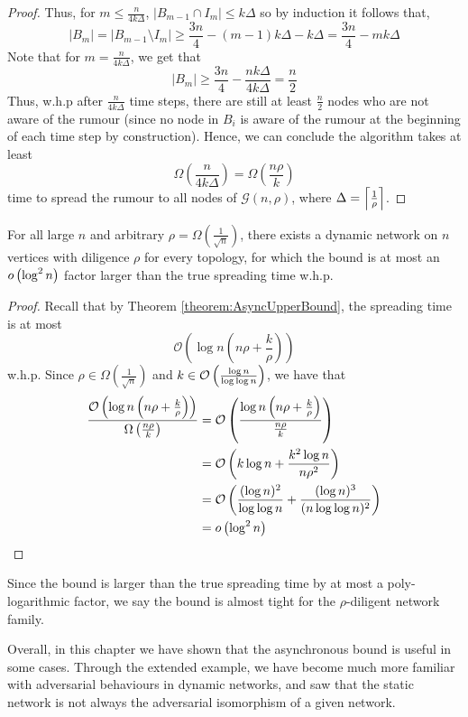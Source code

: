 \begin{proof}
	Thus, for $m \leq \frac{n}{4k\Delta}$, $|B_{m-1} \cap I_m| \leq k\Delta$ so by induction it follows that,
	$$
		|B_m| = |B_{m-1} \setminus I_m| \geq \frac{3n}{4} - (m-1)k\Delta - k\Delta = \frac{3n}{4} - mk\Delta
	$$
	Note that for $m = \frac{n}{4k\Delta}$, we get that 
	$$
		|B_m| \geq \frac{3n}{4} - \frac{nk\Delta}{4k\Delta} = \frac{n}{2}
	$$
	Thus, w.h.p after $\frac{n}{4k\Delta}$ time steps, there are still at least $\frac{n}{2}$ nodes who are not aware of the rumour (since no node in $B_i$ is aware of the rumour at the beginning of each time step by construction). Hence, we can conclude the algorithm takes at least 
	$$
		\Omega\left(\frac{n}{4k\Delta}\right) = \Omega\left(\frac{n\rho}{k}\right)
	$$
	time to spread the rumour to all nodes of $\mathcal{G}(n, \rho)$, where $\Delta = \ceil*{\frac{1}{\rho}}$.
\end{proof}

\begin{corollary}
	For all large $n$ and arbitrary $\rho = \Omega\left(\frac{1}{\sqrt{n}}\right)$, there exists a dynamic network on $n$ vertices with diligence $\rho$ for every topology, for which the bound is at most an $o\lb \log^2 n \rb$ factor larger than the true spreading time w.h.p.
\end{corollary}

\begin{proof}
	Recall that by Theorem \ref{theorem:AsyncUpperBound}, the spreading time is at most
	$$
		\mathcal{O}\left(\log n \left(n \rho + \frac{k}{\rho}\right)\right)
	$$
	w.h.p.
	Since $\rho \in \Omega\left(\frac{1}{\sqrt{n}}\right)$ and  $k \in \bigO \lb \frac{\log n}{\log \log n} \rb$, we have that
	\begin{align*}
		\frac{\bigO \lb \log n \lb n \rho + \frac{k}{\rho} \rb \rb}{\Omega \lb \frac{n\rho}{k} \rb} 
		&= \bigO \lb \frac{\log n \lb n \rho + \frac{k}{\rho} \rb}{\frac{n\rho}{k}} \rb \\
		&= \bigO \lb k \log n + \frac{k^2 \log n}{n \rho^2} \rb \\
		&= \bigO \lb \frac{(\log n)^2}{\log \log n}  + \frac{(\log n)^3}{(n \log \log n)^2} \rb \\
		&= o\lb \log^2 n \rb
	\end{align*}
	
\end{proof}

Since the bound is larger than the true spreading time by at most a poly-logarithmic factor, we say the bound is almost tight for the $\rho$-diligent network family. 

Overall, in this chapter we have shown that the asynchronous bound is useful in some cases. Through the extended example, we have become much more familiar with adversarial behaviours in dynamic networks, and saw that the static network is not always the adversarial isomorphism of a given network.